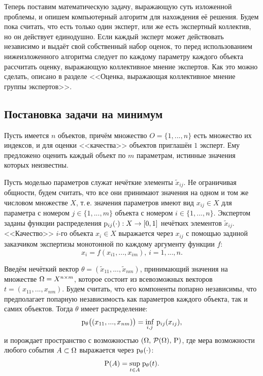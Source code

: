 Теперь поставим математическую задачу, выражающую суть изложенной проблемы, и опишем компьютерный алгоритм для нахождения её решения. Будем пока считать, что есть только один эксперт, или же есть экспертный коллектив, но он действует единодушно. Если каждый эксперт может действовать независимо и выдаёт свой собственный набор оценок, то перед использованием нижеизложенного алгоритма следует по каждому параметру каждого объекта рассчитать оценку, выражающую коллективное мнение экспертов. Как это можно сделать, описано в разделе <<Оценка, выражающая коллективное мнение группы экспертов>>.

\subsection{Постановка задачи на минимум}

Пусть имеется $n$ объектов, причём множество $O = \{1, ..., n\}$ есть множество их индексов, и для оценки <<качества>> объектов приглашён $1$ эксперт. Ему предложено оценить каждый объект по $m$ параметрам, истинные значения которых неизвестны. 

Пусть моделью параметров служат нечёткие элементы $\tilde x_{ij}$. Не ограничивая общности, будем считать, что все они принимают значения на одном и том же числовом множестве $X$, т.\,е. значения параметров имеют вид $x_{ij} \in X$ для параметра с номером $j \in \{1, ..., m\}$ объекта с номером $i \in \{1, ..., n\}$. Экспертом заданы функции распределения ${\mathrm{p}}_{ij}(\cdot): X \rightarrow [0,1]$ нечётких элементов $\tilde x_{ij}$. <<Качество>> $i$-го объекта $x_i \in X$ выражается через $x_{ij}$ с помощью заднной заказчиком экспертизы монотонной по каждому аргументу функции $f$:
\begin{equation}
  \label{e:function_f}
  x_i = f(x_{i1}, ..., x_{im}),\,i = 1, ..., n.
\end{equation}

Введём нечёткий вектор $\theta = (\tilde x_{11}, ..., \tilde x_{nm})$, принимающий значения на множестве $\Omega = X^{n \times m}$, которое состоит из всевозможных векторов $t = (x_{11}, ..., x_{nm})$. %
Будем считать, что его компоненты попарно независимы, что предполагает попарную независимость как параметров каждого объекта, так и самих объектов. Тогда $\theta$ имеет распределение: 
\begin{equation} 
	\label{e:p_theta_def}
	{\mathrm{p}}_{\theta}\big((x_{11}, ..., x_{nm})\big) = \inf_{i, j}\,{\mathrm{p}}_{ij}(x_{ij}),
\end{equation}
и порождает пространство с возможностью ${(\Omega,\,\mathcal{P}(\Omega),\,{\mathrm{P}})}$, где мера возможности любого события $A \subset \Omega$ выражается через ${\mathrm{p}}_{\theta}(\cdot)$: 
\begin{equation} 
	\label{e:P_theta_def}
	{\mathrm{P}}(A) = \underset{t \in A} \sup\;{\mathrm{p}}_{\theta}(t). 
\end{equation}


